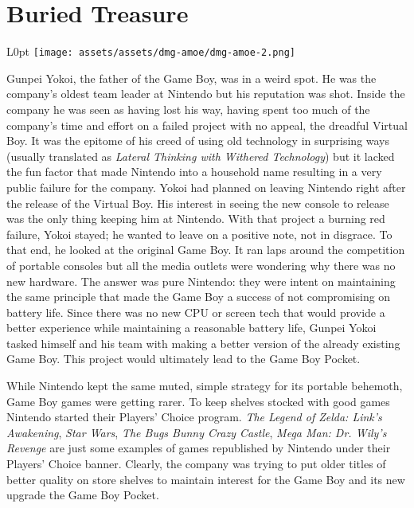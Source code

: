 \documentclass{book}
\begin{document}
\newpage\FloatBarrier\needspace{10mm}\section*{Buried Treasure}\nopagebreak[4]
\begin{wrapfigure}{L}{0pt} \texttt{[image: assets/assets/dmg-amoe/dmg-amoe-2.png]}\end{wrapfigure}
Gunpei Yokoi, the father of the Game Boy, was in a weird spot. He was the company’s oldest team leader at Nintendo but his reputation was shot. Inside the company he was seen as having lost his way, having spent too much of the company’s time and effort on a failed project with no appeal, the dreadful Virtual Boy. It was the epitome of his creed of using old technology in surprising ways (usually translated as \emph{Lateral Thinking with Withered Technology}) but it lacked the fun factor that made Nintendo into a household name resulting in a very public failure for the company. Yokoi had planned on leaving Nintendo right after the release of the Virtual Boy. His interest in seeing the new console to release was the only thing keeping him at Nintendo. With that project a burning red failure, Yokoi stayed; he wanted to leave on a positive note, not in disgrace. To that end, he looked at the original Game Boy. It ran laps around the competition of portable consoles but all the media outlets were wondering why there was no new hardware. The answer was pure Nintendo: they were intent on maintaining the same principle that made the Game Boy a success of not compromising on battery life. Since there was no new CPU or screen tech that would provide a better experience while maintaining a reasonable battery life, Gunpei Yokoi tasked himself and his team with making a better version of the already existing Game Boy. This project would ultimately lead to the Game Boy Pocket.

While Nintendo kept the same muted, simple strategy for its portable behemoth, Game Boy games were getting rarer. To keep shelves stocked with good games Nintendo started their Players’ Choice program. \emph{The Legend of Zelda: Link’s Awakening}, \emph{Star Wars}, \emph{The Bugs Bunny Crazy Castle}, \emph{Mega Man: Dr. Wily’s Revenge} are just some examples of games republished by Nintendo under their Players’ Choice banner. Clearly, the company was trying to put older titles of better quality on store shelves to maintain interest for the Game Boy and its new upgrade the Game Boy Pocket.
\end{document}
